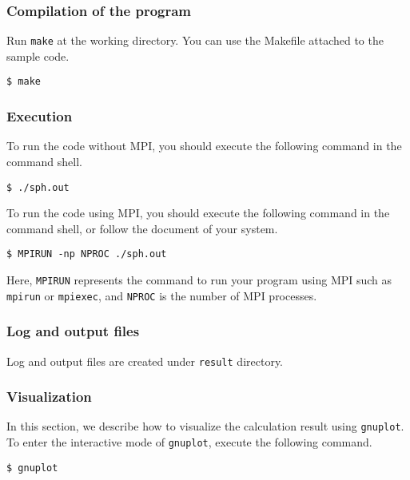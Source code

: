 \subsubsection{Compilation of the program}
Run \texttt{make} at the working directory. You can use the Makefile attached to the sample code.
\begin{screen}
\begin{verbatim}
$ make
\end{verbatim}
\end{screen}

\subsubsection{Execution}
To run the code without MPI, you should execute the following command in the command shell.
\begin{screen}
\begin{verbatim}
$ ./sph.out
\end{verbatim}
\end{screen}

To run the code using MPI, you should execute the following command in the command shell, or follow the document of your system.
\begin{screen}
\begin{verbatim}
$ MPIRUN -np NPROC ./sph.out
\end{verbatim}
\end{screen}
Here, \texttt{MPIRUN} represents the command to run your program using MPI such as \texttt{mpirun} or \texttt{mpiexec}, and \texttt{NPROC} is the number of MPI processes.


\subsubsection{Log and output files}
Log and output files are created under {\tt result} directory.

\subsubsection{Visualization}
In this section, we describe how to visualize the calculation result using \texttt{gnuplot}. To enter the interactive mode of \texttt{gnuplot}, execute the following command.

\begin{screen}
\begin{verbatim}
$ gnuplot
\end{verbatim}
\end{screen}

